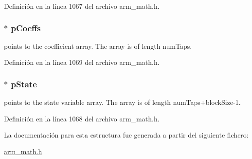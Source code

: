 Definición en la línea 1067 del archivo arm\+\_\+math.\+h.

\subsubsection[{\texorpdfstring{p\+Coeffs}{pCoeffs}}]{$\ast$ p\+Coeffs}\hypertarget{structarm__fir__instance__q31_a68888e36167d81cb7836db10367a1682}{}\label{structarm__fir__instance__q31_a68888e36167d81cb7836db10367a1682}
points to the coefficient array. The array is of length num\+Taps. 

Definición en la línea 1069 del archivo arm\+\_\+math.\+h.

\subsubsection[{\texorpdfstring{p\+State}{pState}}]{$\ast$ p\+State}\hypertarget{structarm__fir__instance__q31_adee4ba3ee8869865af7d8fa08ca913d6}{}\label{structarm__fir__instance__q31_adee4ba3ee8869865af7d8fa08ca913d6}
points to the state variable array. The array is of length num\+Taps+block\+Size-\/1. 

Definición en la línea 1068 del archivo arm\+\_\+math.\+h.



La documentación para esta estructura fue generada a partir del siguiente fichero\+:\begin{DoxyCompactItemize}
\item 
\hyperlink{arm__math_8h}{arm\+\_\+math.\+h}\end{DoxyCompactItemize}
